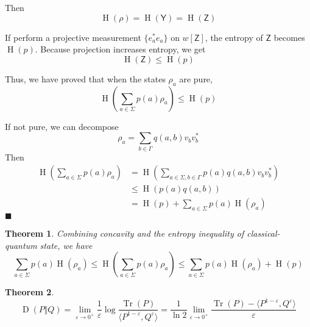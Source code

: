 \documentclass[aps,pra,onecolumn,notitlepage,superscriptaddress]{revtex4-1}
\newcommand{\reg}[1]{\mathsf{#1}}
\def\>{\rangle}
\def\<{\langle}
\newcommand{\Tr}{\operatorname{Tr}}
\newcommand{\op}[1]{\operatorname{#1}}
\newtheorem{theo}{Theorem}
\def\qed{$\blacksquare$ \newline}
\begin{document}
    Then
    \begin{equation}
        \op H(\rho) = \op H(\reg Y) = \op H(\reg Z)
    \end{equation}

    If perform a projective measurement $\{ e_a^* e_a \}$ on $w[\reg Z]$, the entropy of $\reg Z$ becomes $\op H(p)$. Because projection increases entropy, we get
    \begin{equation}
        \op H(\reg Z) \leq \op H(p)
    \end{equation}

    Thus, we have proved that when the states $\rho_a$ are pure,
    \begin{equation}
        \op H \left(\sum_{a \in \Sigma} p(a) \rho_a \right) \leq \op H(p)
    \end{equation}

    If not pure, we can decompose
    \begin{equation}
        \rho_a = \sum_{b \in \Gamma} q(a,b) v_bv_b^*
    \end{equation}
    Then
    \begin{align*}
        \op H \left(\sum_{a \in \Sigma} p(a) \rho_a \right)
        &= \op H \left(\sum_{a \in \Sigma, b \in \Gamma} p(a) q(a,b) v_bv_b^* \right) \\
        &\leq \op H(p(a)q(a,b)) \\
        &= \op H(p) + \sum_{a \in \Sigma} p(a) \op H(\rho_a)
    \end{align*}
    \qed

    \begin{theo}
        Combining concavity and the entropy inequality of classical-quantum state, we have
        \begin{equation}
            \sum_{a \in \Sigma} p(a) \op H(\rho_a) \leq \op H \left(\sum_{a \in \Sigma} p(a) \rho_a \right) \leq \sum_{a \in \Sigma} p(a) \op H(\rho_a) + \op H(p)
        \end{equation}
    \end{theo}

    \begin{theo}
        \begin{equation}
            \op D(P \Vert Q) = \lim_{\varepsilon \to 0^+} \frac 1 \varepsilon \log \frac{\Tr(P)}{\< P^{1-\varepsilon}, Q^\varepsilon \>} = \frac{1}{\ln 2} \lim_{\varepsilon \to 0^+}\frac{\Tr (P) - \< P^{1-\varepsilon}, Q^\varepsilon\>}{\varepsilon}
        \end{equation}
    \end{theo}
\end{document}

